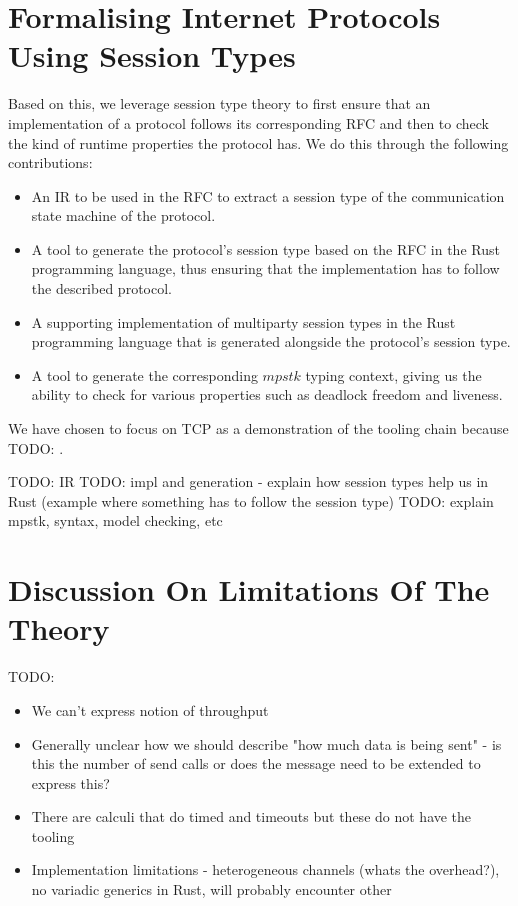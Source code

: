\documentclass{article}
\newcommand{\todo}[1]{}
\renewcommand{\todo}[1]{{\color{red} TODO: {#1}}}
\begin{document}
\section{Formalising Internet Protocols Using Session Types}

Based on this, we leverage session type theory to first ensure that an implementation of a protocol follows its corresponding RFC and then to check the kind of runtime properties the protocol has.
We do this through the following contributions:

\begin{itemize}
    \item An IR to be used in the RFC to extract a session type of the communication state machine of the protocol.
    \item A tool to generate the protocol's session type based on the RFC in the Rust programming language, thus ensuring that the implementation has to follow the described protocol.
    \item A supporting implementation of multiparty session types in the Rust programming language that is generated alongside the protocol's session type.
    \item A tool to generate the corresponding \ensuremath{mpstk} typing context, giving us the ability to check for various properties such as deadlock freedom and liveness.
\end{itemize}

We have chosen to focus on TCP as a demonstration of the tooling chain because \todo.

\todo{IR}
\todo{impl and generation - explain how session types help us in Rust (example where something has to follow the session type)}
\todo{explain mpstk, syntax, model checking, etc}

\section{Discussion On Limitations Of The Theory}

\todo{
    \begin{itemize}
        \item We can't express notion of throughput
        \item Generally unclear how we should describe "how much data is being sent" - is this the number of send calls or does the message need to be extended to express this?
        \item There are calculi that do timed and timeouts but these do not have the tooling
        \item Implementation limitations - heterogeneous channels (whats the overhead?), no variadic generics in Rust, will probably encounter other
    \end{itemize}
}
\end{document}
